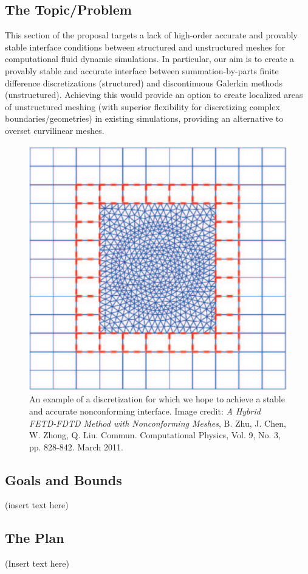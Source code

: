 \subsection{The Topic/Problem}

This section of the proposal targets a lack of high-order accurate and
provably stable interface conditions between structured and unstructured
meshes for computational fluid dynamic simulations. In particular, our aim
is to create a provably stable and accurate interface between summation-by-parts
finite difference discretizations (structured) and discontinuous Galerkin
methods (unstructured).  Achieving this would provide an option to create localized
areas of unstructured meshing (with superior flexibility for discretizing complex
boundaries/geometries) in existing simulations, providing an alternative to
overset curvilinear meshes.


\begin{figure}
\centering
\includegraphics[width=0.3\linewidth,trim=4 4 4 4,clip]{figures/nonconforming_sample_1.png}
\caption{An example of a discretization for which we hope to achieve a stable and accurate nonconforming interface.
         Image credit: \emph{A Hybrid FETD-FDTD Method with Nonconforming Meshes}, B. Zhu, J. Chen, W. Zhong, Q. Liu.
         Commun. Computational Physics, Vol. 9, No. 3, pp. 828-842. March 2011.}
\label{fig:nonconforming_1}
\end{figure}

\subsection{Goals and Bounds}
(insert text here)

\subsection{The Plan}
(Insert text here)


